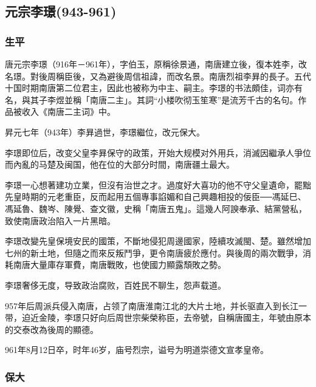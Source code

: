 
\subsection{元宗李璟\tiny(943-961)}

\subsubsection{生平}

唐元宗李璟（916年－961年），字伯玉，原稱徐景通，南唐建立後，復本姓李，改名璟。對後周稱臣後，又為避後周信祖諱，而改名景。南唐烈祖李昪的長子。五代十国时期南唐第二位君主，因此也被称为中主、嗣主。李璟的书法頗佳，词亦有名，與其子李煜並稱「南唐二主」。其詞“小楼吹彻玉笙寒”是流芳千古的名句。作品被收入《南唐二主词》中。

昇元七年（943年）李昪過世，李璟繼位，改元保大。

李璟即位后，改变父皇李昪保守的政策，开始大规模对外用兵，消滅因繼承人爭位而內亂的马楚及闽国，他在位的大部分时間，南唐疆土最大。

李璟一心想著建功立業，但沒有治世之才。過度好大喜功的他不守父皇遺命，罷黜先皇時期的元老重臣，反而起用五個專事諂媚和自己興趣相投的佞臣──馮延巳、馮延魯、魏岑、陳覺、查文徽，史稱「南唐五鬼」。這幾人阿諛奉承、結黨營私，致使南唐政治陷入一片黑暗。

李璟改變先皇保境安民的國策，不斷地侵犯周邊國家，陸續攻滅閩、楚。雖然增加七州的新土地，但隨之而來反叛鬥爭，更令南唐疲於應付。與後周的兩次戰爭，消耗南唐大量庫存軍費，南唐戰敗，也使國力顯露頹敗之勢。

李璟奢侈无度，导致政治腐败，百姓民不聊生，怨声载道。

957年后周派兵侵入南唐，占领了南唐淮南江北的大片土地，并长驱直入到长江一带，迫近金陵，李璟只好向后周世宗柴榮称臣，去帝號，自稱唐國主，年號由原本的交泰改為後周的顯德。

961年8月12日卒，时年46岁，庙号烈宗，谥号为明道崇德文宣孝皇帝。

\subsubsection{保大}

